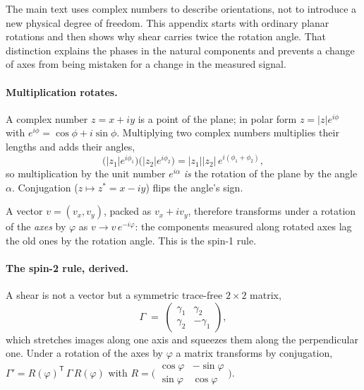\documentclass[11pt]{article}
\numberwithin{equation}{section}
\begin{document}
The main text uses complex numbers to describe orientations, not to
introduce a new physical degree of freedom. This appendix starts with
ordinary planar rotations and then shows why shear carries twice the
rotation angle. That distinction explains the phases in the natural
components and prevents a change of axes from being mistaken for a change
in the measured signal.

\paragraph{Multiplication rotates.}
A complex number $z = x + i y$ is a point of the plane; in polar
form $z = |z| e^{i\phi}$ with $e^{i\phi} = \cos\phi + i\sin\phi$.
Multiplying two complex numbers multiplies their lengths and adds
their angles,
\begin{equation}
  \bigl(|z_1| e^{i\phi_1}\bigr)\bigl(|z_2| e^{i\phi_2}\bigr)
  = |z_1||z_2|\, e^{i(\phi_1 + \phi_2)} ,
  \label{eq:complexmult}
\end{equation}
so multiplication by the unit number $e^{i\alpha}$ \emph{is} the
rotation of the plane by the angle $\alpha$.  Conjugation
($z \mapsto z^* = x - iy$) flips the angle's sign.

A vector $v = (v_x, v_y)$, packed as $v_x + i v_y$, therefore
transforms under a rotation of the \emph{axes} by $\varphi$ as
$v \to v\, e^{-i\varphi}$: the components measured along rotated
axes lag the old ones by the rotation angle.  This is the spin-1
rule.

\paragraph{The spin-2 rule, derived.}
A shear is not a vector but a symmetric trace-free $2\times 2$
matrix,
\begin{equation}
  \Gamma \;=\;
  \begin{pmatrix}
    \gamma_1 & \gamma_2 \\
    \gamma_2 & -\gamma_1
  \end{pmatrix},
  \label{eq:shearmatrix}
\end{equation}
which stretches images along one axis and squeezes them along the
perpendicular one.  Under a rotation of the axes by $\varphi$ a
matrix transforms by conjugation,
$\Gamma' = R(\varphi)^{\mathsf T}\, \Gamma\, R(\varphi)$ with
$R = \bigl(\begin{smallmatrix}
\cos\varphi & -\sin\varphi \\ \sin\varphi & \cos\varphi
\end{smallmatrix}\bigr)$.
\end{document}
